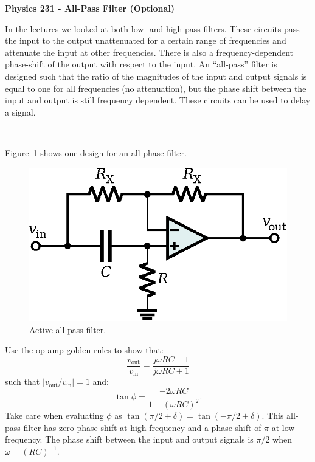 \documentclass[12pt,oneside,openany,letterpaper]{article}
\begin{document}
\thispagestyle{plain}
\begin{center}
{\large{\bf{\selectfont Physics 231 - All-Pass Filter (Optional)}}}
\end{center}


\noindent In the lectures we looked at both low- and high-pass filters.  These circuits pass the input to the output unattenuated for a certain range of frequencies and attenuate the input at other frequencies.  There is also a frequency-dependent phase-shift of the output with respect to the input.  An ``all-pass'' filter is designed such that the ratio of the magnitudes of the input and output signals is equal to one for all frequencies (no attenuation), but the phase shift between the input and output is still frequency dependent.  These circuits can be used to delay a signal.

~

\noindent Figure~\ref{fig:active} shows one design for an all-phase filter. 
\begin{figure}[h!]
\begin{center}
\includegraphics[width=7 cm]{figures/Active_Allpass_Filter.eps}
\caption{\label{fig:active} Active all-pass filter.}
\end{center}
\end{figure}
\newline Use the op-amp golden rules to show that:
\begin{equation}
\frac{v_\mathrm{out}}{v_\mathrm{in}}=\frac{j\omega R C-1}{j\omega R C+1}
\end{equation}
such that $\left\vert v_\mathrm{out}/v_\mathrm{in}\right\vert=1$ and:
\begin{equation}
\tan\phi=\frac{-2\omega RC}{1-\left(\omega RC\right)^2}.
\end{equation}
Take care when evaluating $\phi$ as $\tan\left(\pi/2+\delta\right)=\tan\left(-\pi/2+\delta\right)$.  This all-pass filter has zero phase shift at high frequency and a phase shift of $\pi$ at low frequency.  The phase shift between the input and output signals is $\pi/2$ when $\omega=(RC)^{-1}$.
\end{document}
